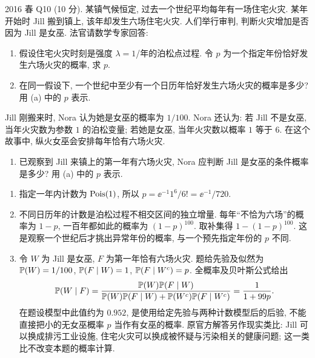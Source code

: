 \begin{exercise}\label{ex:fe2016q10}
2016 春 Q10 (10 分). 某镇气候恒定, 过去一个世纪平均每年有一场住宅火灾. 某年开始时 Jill 搬到镇上, 该年却发生六场住宅火灾. 人们举行审判, 判断火灾增加是否因为 Jill 是女巫. 法官请数学专家回答:
\begin{enumerate}[label=(\alph*)]
\item\label{ex:fe2016q10-a} 假设住宅火灾时刻是强度 $\lambda=1$/年的泊松点过程. 令 $p$ 为一个指定年份恰好发生六场火灾的概率, 求 $p$.
\item\label{ex:fe2016q10-b} 在同一假设下, 一个世纪中至少有一个日历年恰好发生六场火灾的概率是多少? 用 (a) 中的 $p$ 表示.
\end{enumerate}
Jill 刚搬来时, Nora 认为她是女巫的概率为 $1/100$. Nora 还认为: 若 Jill 不是女巫, 当年火灾数为参数 $1$ 的泊松变量; 若她是女巫, 当年火灾数以概率 $1$ 等于 $6$. 在这个故事中, 纵火女巫会安排每年恰有六场火灾.
\begin{enumerate}[label=(\alph*),start=3]
\item\label{ex:fe2016q10-c} 已观察到 Jill 来镇上的第一年有六场火灾, Nora 应判断 Jill 是女巫的条件概率是多少? 用 (a) 中的 $p$ 表示.
\end{enumerate}
\end{exercise}
\begin{solution}
\begin{enumerate}[label=(\alph*)]
\item\label{sol:fe2016q10-a} 指定一年内计数为 $\operatorname{Pois}(1)$, 所以 $p=\ee^{-1}1^6/6!=\ee^{-1}/720$.
\item\label{sol:fe2016q10-b} 不同日历年的计数是泊松过程不相交区间的独立增量. 每年“不恰为六场”的概率为 $1-p$, 一百年都如此的概率为 $(1-p)^{100}$. 取补集得 $1-(1-p)^{100}$. 这是观察一个世纪后才挑出异常年份的概率, 与一个预先指定年份的 $p$ 不同.
\item\label{sol:fe2016q10-c} 令 $W$ 为 Jill 是女巫, $F$ 为第一年恰有六场火灾. 题给先验及似然为
$\mathbb P(W)=1/100$, $\mathbb P(F\mid W)=1$, $\mathbb P(F\mid W^c)=p$. 全概率及贝叶斯公式给出
\[
 \mathbb P(W\mid F)
 =\frac{\mathbb P(W)\mathbb P(F\mid W)}{\mathbb P(W)\mathbb P(F\mid W)+\mathbb P(W^c)\mathbb P(F\mid W^c)}
 =\frac{1}{1+99p}.
\]
在题设模型中此值约为 $0.952$, 是使用给定先验与两种计数模型后的后验, 不能直接把小的无女巫概率 $p$ 当作有女巫的概率. 原官方解答另作现实类比: Jill 可以换成排污工业设施, 住宅火灾可以换成被怀疑与污染相关的健康问题; 这一类比不改变本题的概率计算.
\end{enumerate}
\end{solution}
